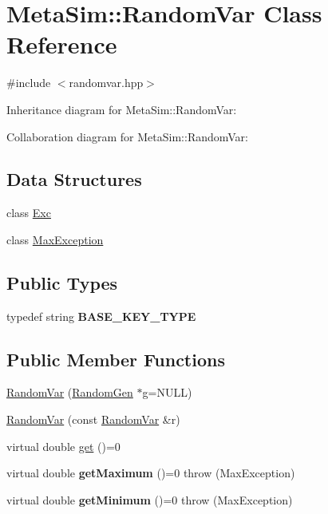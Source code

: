 \hypertarget{classMetaSim_1_1RandomVar}{}\section{Meta\+Sim\+:\+:Random\+Var Class Reference}
\label{classMetaSim_1_1RandomVar}


{\ttfamily \#include $<$randomvar.\+hpp$>$}



Inheritance diagram for Meta\+Sim\+:\+:Random\+Var\+:


Collaboration diagram for Meta\+Sim\+:\+:Random\+Var\+:
\subsection*{Data Structures}
\begin{DoxyCompactItemize}
\item 
class \hyperlink{classMetaSim_1_1RandomVar_1_1Exc}{Exc}
\item 
class \hyperlink{classMetaSim_1_1RandomVar_1_1MaxException}{Max\+Exception}
\end{DoxyCompactItemize}
\subsection*{Public Types}
\begin{DoxyCompactItemize}
\item 
typedef string {\bfseries B\+A\+S\+E\+\_\+\+K\+E\+Y\+\_\+\+T\+Y\+PE}
\end{DoxyCompactItemize}
\subsection*{Public Member Functions}
\begin{DoxyCompactItemize}
\item 
\hyperlink{group__metasim__random_ga465214e20898d424b2083c270361d161}{Random\+Var} (\hyperlink{classMetaSim_1_1RandomGen}{Random\+Gen} $\ast$g=N\+U\+LL)
\item 
\hyperlink{group__metasim__random_ga22bc5cb0b21f5c0c72f0a15242c44a75}{Random\+Var} (const \hyperlink{classMetaSim_1_1RandomVar}{Random\+Var} \&r)
\item 
virtual double \hyperlink{group__metasim__random_ga9299062bad4e4aa77c9cef1f687f964b}{get} ()=0
\item 
virtual double {\bfseries get\+Maximum} ()=0  throw (\+Max\+Exception)
\item 
virtual double {\bfseries get\+Minimum} ()=0  throw (\+Max\+Exception)
\end{DoxyCompactItemize}
